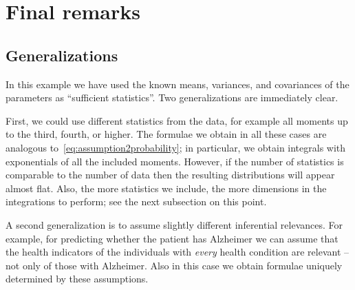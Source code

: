 \documentclass[\ifafour a4paper,12pt,\else a5paper,10pt,\fi%
onecolumn,oneside,article,%
british%
]{memoir}
\theoremstyle{remark}
\theoremstyle{innote}
\renewcommand*{\|}{\mathpunct{|}}
\newcommand*{\fig}{fig.}%
\theoremstyle{plain}
\begin{document}
\clearpage

\section{Final remarks}
\label{sec:remarks}

\subsection{Generalizations}
\label{sec:generalizations}

In this example we have used the known means, variances, and covariances of
the parameters as \enquote{sufficient statistics}. Two generalizations
are immediately clear.


First, we could use different statistics from the data, for example all
moments up to the third, fourth, or higher. The formulae we obtain in all
these cases are analogous to~\eqref{eq:assumption2probability}; in
particular, we obtain integrals with exponentials of all the included
moments. However, if the number of statistics is comparable to the number
of data then the resulting distributions will appear almost flat. Also, the
more statistics we include, the more dimensions in the integrations to
perform; see the next subsection on this point.

A second generalization is to assume slightly different inferential
relevances. For example, for predicting whether the patient has Alzheimer
we can assume that the health indicators of the individuals with
\emph{every} health condition are relevant -- not only of those with
Alzheimer. Also in this case we obtain formulae uniquely determined by
these assumptions.
\end{document}
